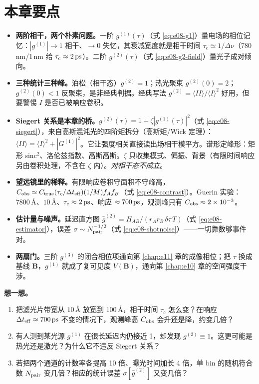 \section{本章要点}
\label{sec:e08-summary}

\begin{itemize}
  \item \textbf{两阶相干，两个朴素问题。}一阶 \(g^{(1)}(\tau)\)（式 \eqref{eq:e08-g1}）量电场的相位记忆：\(|g^{(1)}|\to1\) 相干、\(\to0\) 失忆，其衰减宽度就是相干时间 \(\tau_c\simeq1/\Delta\nu\)（780\,nm/1\,nm 给 \(\tau_c\approx2\,{\rm ps}\)）。二阶 \(g^{(2)}(\tau)\)（式 \eqref{eq:e08-g2-field}）量光子成对倾向。
  \item \textbf{三种统计三种峰。}泊松（相干态）\(g^{(2)}=1\)；热光聚束 \(g^{(2)}(0)=2\)；\(g^{(2)}(0)<1\) 反聚束，是非经典判据。经典写法 \(g^{(2)}=\langle II\rangle/\langle I\rangle^2\) 好用，但要警惕 \(I\) 是否已被响应卷积。
  \item \textbf{Siegert 关系是本章的桥。}\(g^{(2)}(\tau)=1+\zeta|g^{(1)}(\tau)|^2\)（式 \eqref{eq:e08-siegert}），来自高斯混沌光的四阶矩拆分（高斯矩/Wick 定理）：\(\langle II\rangle=\langle I\rangle^2+|G^{(1)}|^2\)。它让强度相关直接读出场相干模平方。谱形定峰形：矩形 sinc\(^2\)、洛伦兹指数、高斯高斯。\(\zeta\) 只收集模式、偏振、背景（有限时间响应另由卷积处理，不含在 \(\zeta\) 内）。\emph{对相干态不成立}。
  \item \textbf{望远镜里的稀释。}有限响应卷积守面积不守峰高，\(C_{\rm obs}\simeq C_{\rm true}(\tau_c/\Delta t_{\rm eff})(1/M)f_Af_B\)（式 \eqref{eq:e08-contrast}）。Guerin 实验：\(7800\,\text{\AA}\)、\(10\,\text{\AA}\)、\(\tau_c\approx2\,{\rm ps}\)、响应 \(\approx700\,{\rm ps}\)，观测峰只有 \(C_{\rm obs}\approx2\times10^{-3}\)。
  \item \textbf{估计量与噪声。}延迟直方图 \(\widehat g^{(2)}=H_{AB}/(r_Ar_B\,\delta\tau\,T)\)（式 \eqref{eq:e08-estimator}），误差 \(\sigma\sim N_{\rm pair}^{-1/2}\)（式 \eqref{eq:e08-shotnoise}）——一切靠数够事件对。
  \item \textbf{两扇门。}三阶 \(g^{(3)}\) 的闭合相位项通向第 \ref{chap:e11} 章的成像相位；把 \(\tau\) 换成基线 \(\bm B\)，\(g^{(1)}\) 就成了复可见度 \(V(\bm B)\)，通向第 \ref{chap:e10} 章的空间强度干涉。
\end{itemize}

\medskip
\noindent\textbf{想一想。}
\begin{enumerate}
  \item 把滤光片带宽从 \(10\,\text{\AA}\) 放宽到 \(100\,\text{\AA}\)，相干时间 \(\tau_c\) 怎么变？在响应 \(\Delta t_{\rm eff}\approx700\,{\rm ps}\) 不变的情况下，观测峰高 \(C_{\rm obs}\) 会升还是降，约变几倍？
  \item 有人测到某光源 \(g^{(1)}\) 在很长延迟内仍接近 1，却发现 \(g^{(2)}\equiv1\)。这更可能是热光还是激光？为什么它不违反 Siegert 关系？
  \item 若把两个通道的计数率各提高 10 倍、曝光时间加长 4 倍，单 bin 的随机符合数 \(N_{\rm pair}\) 变几倍？相应的统计误差 \(\sigma[\widehat g^{(2)}]\) 又变几倍？
\end{enumerate}
